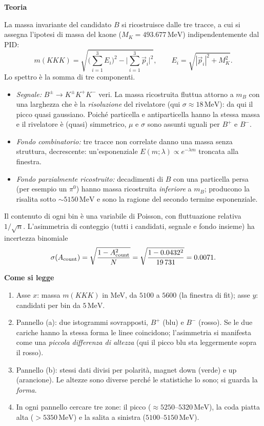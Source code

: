 \documentclass[10.5pt,a4paper]{article}
\newcommand{\MeV}{\,\mathrm{MeV}}
\newcommand{\sez}[1]{\par\Needspace{6\baselineskip}\medskip\noindent\textbf{\large #1}\par\nopagebreak\smallskip}
\begin{document}
\sez{Teoria}
La massa invariante del candidato $B$ si ricostruisce dalle tre tracce, a cui si assegna l'ipotesi di massa del kaone ($M_K=493.677\MeV$) indipendentemente dal PID:
\[
m(KKK)=\sqrt{\Big(\sum_{i=1}^3E_i\Big)^2-\Big|\sum_{i=1}^3\vec p_i\Big|^2},\qquad E_i=\sqrt{|\vec p_i|^2+M_K^2}.
\]
Lo spettro è la somma di tre componenti.
\begin{itemize}
\item \emph{Segnale:} $B^\pm\to K^\pm K^+K^-$ veri. La massa ricostruita fluttua attorno a $m_B$ con una larghezza che è la \emph{risoluzione} del rivelatore (qui $\sigma\approx18\MeV$): da qui il picco quasi gaussiano. Poiché particella e antiparticella hanno la stessa massa e il rivelatore è (quasi) simmetrico, $\mu$ e $\sigma$ sono assunti uguali per $B^+$ e $B^-$.
\item \emph{Fondo combinatorio:} tre tracce non correlate danno una massa senza struttura, decrescente: un'esponenziale $E(m;\lambda)\propto e^{-\lambda m}$ troncata alla finestra.
\item \emph{Fondo parzialmente ricostruito:} decadimenti di $B$ con una particella persa (per esempio un $\pi^0$) hanno massa ricostruita \emph{inferiore} a $m_B$; producono la risalita sotto $\sim5150\MeV$ e sono la ragione del secondo termine esponenziale.
\end{itemize}
Il contenuto di ogni bin è una variabile di Poisson, con fluttuazione relativa $1/\sqrt n$. L'asimmetria di conteggio (tutti i candidati, segnale e fondo insieme) ha incertezza binomiale
\[
\sigma(A_{\rm count})=\sqrt{\frac{1-A_{\rm count}^2}{N}}=\sqrt{\frac{1-0.0432^2}{19\,731}}=0.0071.
\]

\sez{Come si legge}
\begin{enumerate}
\item Asse $x$: massa $m(KKK)$ in MeV, da $5100$ a $5600$ (la finestra di fit); asse $y$: candidati per bin da $5\MeV$.
\item Pannello (a): due istogrammi sovrapposti, $B^+$ (blu) e $B^-$ (rosso). Se le due cariche hanno la stessa forma le linee coincidono; l'asimmetria si manifesta come una \emph{piccola differenza di altezza} (qui il picco blu sta leggermente sopra il rosso).
\item Pannello (b): stessi dati divisi per polarità, magnet down (verde) e up (arancione). Le altezze sono diverse perché le statistiche lo sono; si guarda la \emph{forma}.
\item In ogni pannello cercare tre zone: il picco ($\approx5250$--$5320\MeV$), la coda piatta alta ($>5350\MeV$) e la salita a sinistra ($5100$--$5150\MeV$).
\end{enumerate}
\end{document}
